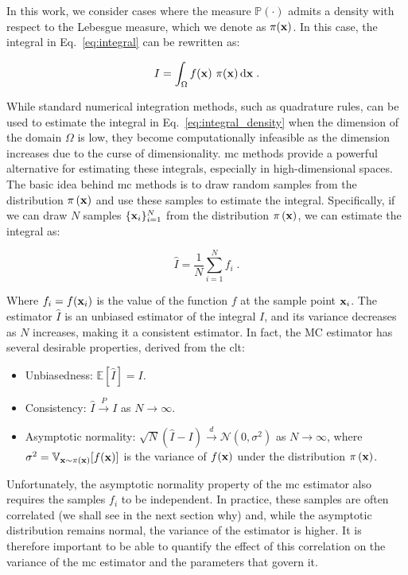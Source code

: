 \smallskip
In this work, we consider cases where the measure $\mathbb{P}(\cdot)$ admits a density with respect to the Lebesgue measure, which we denote as $\pi(\mathbf{x})$. In this case, the integral in Eq.~\eqref{eq:integral} can be rewritten as:

\begin{equation}
  I = \int_{\Omega} f(\mathbf{x})\ \pi(\mathbf{x})\, \text{d}\mathbf{x}\;.
  \label{eq:integral_density}
\end{equation}

While standard numerical integration methods, such as quadrature rules, can be used to estimate the integral in Eq.~\eqref{eq:integral_density} when the dimension of the domain $\Omega$ is low, they become computationally infeasible as the dimension increases due to the curse of dimensionality. \gls{mc} methods provide a powerful alternative for estimating these integrals, especially in high-dimensional spaces. The basic idea behind \gls{mc} methods is to draw random samples from the distribution $\pi \left( \mathbf{x}\right)$ and use these samples to estimate the integral. Specifically, if we can draw $N$ samples $\{\mathbf{x}_i\}_{i=1}^N$ from the distribution $\pi \left( \mathbf{x}\right)$, we can estimate the integral as:

\begin{equation}
  \hat{I} = \frac{1}{N} \sum_{i=1}^N f_i\;.
  \label{eq:mc_estimate}
\end{equation}

Where $f_i = f(\mathbf{x}_i)$ is the value of the function $f$ at the sample point $\mathbf{x}_i$. The estimator $\hat{I}$ is an unbiased estimator of the integral $I$, and its variance decreases as $N$ increases, making it a consistent estimator. In fact, the MC estimator has several desirable properties, derived from the \gls{clt}:

\begin{itemize}
  \item Unbiasedness: $\mathbb{E}[\hat{I}] = I$.
  \item Consistency: $\hat{I} \xrightarrow{P} I$ as $N \to \infty$.
  \item Asymptotic normality: $\sqrt{N}(\hat{I} - I) \xrightarrow{d} \mathcal{N}(0, \sigma^2)$ as $N \to \infty$, where $\sigma^2 = \mathbb{V}_{\mathbf{x} \sim \pi \left( \mathbf{x}\right)}[f(\mathbf{x})]$ is the variance of $f(\mathbf{x})$ under the distribution $\pi \left( \mathbf{x}\right)$.
\end{itemize}

Unfortunately, the asymptotic normality property of the \gls{mc} estimator also requires the samples $f_i$ to be independent. In practice, these samples are often correlated (we shall see in the next section why) and, while the asymptotic distribution remains normal, the variance of the estimator is higher. It is therefore important to be able to quantify the effect of this correlation on the variance of the \gls{mc} estimator and the parameters that govern it. 

